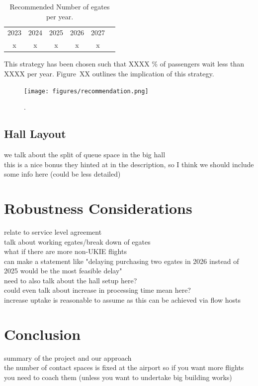 \documentclass[10pt]{article}
\begin{document}
\begin{table}[!htp]
    \centering
    \begin{tabular}{cccccc}
         2023 & 2024 & 2025 & 2026 & 2027  \\
          x & x & x & x & x
    \end{tabular}
    \caption{Recommended Number of \glspl{egate} per year.}
    \label{tab:recommendation}
\end{table}

This strategy has been chosen such that XXXX \% of passengers wait less than XXXX per year. Figure~XX outlines the implication of this strategy. 

\begin{figure}[!ht]
    \centering
    \texttt{[image: figures/recommendation.png]}
     \caption{
    .} \label{fig:workflow_fig}
\end{figure}



\subsection{Hall Layout}
we talk about the split of queue space in the big hall \\
this is a nice bonus they hinted at in the description, so I think we should include some info here (could be less detailed)


\section{Robustness Considerations} \label{sec:robustness}
relate to service level agreement \\
talk about working \glspl{egate}/break down of \glspl{egate}  \\
what if there are more non-UKIE flights  \\  
can make a statement like "delaying purchasing two egates in 2026 instead of 2025 would be the most feasible delay" \\
need to also talk about the hall setup here? \\
could even talk about increase in processing time mean here? \\
increase uptake is reasonable to assume as this can be achieved via flow hosts



\section{Conclusion}
summary of the project and our approach \\
the number of contact spaces is fixed at the airport so if you want more flights you need to coach them (unless you want to undertake big building works) 
\end{document}
